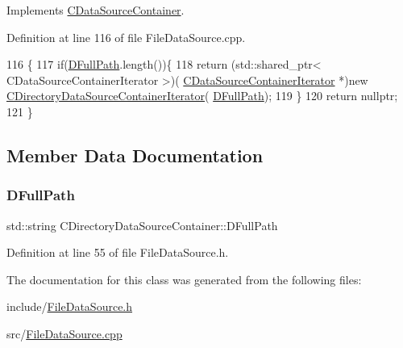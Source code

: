 Implements \hyperlink{classCDataSourceContainer_ad50184dd4ec1c79c776fe0d7d9910925}{C\+Data\+Source\+Container}.



Definition at line 116 of file File\+Data\+Source.\+cpp.


\begin{DoxyCode}
116                                                                                   \{
117     \textcolor{keywordflow}{if}(\hyperlink{classCDirectoryDataSourceContainer_ac3d3c7e7d7bc9f68ba8a8747a3dee8b5}{DFullPath}.length())\{
118         \textcolor{keywordflow}{return} (std::shared\_ptr< CDataSourceContainerIterator >)(
      \hyperlink{classCDataSourceContainerIterator}{CDataSourceContainerIterator} *)\textcolor{keyword}{new} 
      \hyperlink{classCDirectoryDataSourceContainerIterator}{CDirectoryDataSourceContainerIterator}(
      \hyperlink{classCDirectoryDataSourceContainer_ac3d3c7e7d7bc9f68ba8a8747a3dee8b5}{DFullPath});
119     \}
120     \textcolor{keywordflow}{return} \textcolor{keyword}{nullptr};
121 \}
\end{DoxyCode}


\subsection{Member Data Documentation}
\hypertarget{classCDirectoryDataSourceContainer_ac3d3c7e7d7bc9f68ba8a8747a3dee8b5}{}\label{classCDirectoryDataSourceContainer_ac3d3c7e7d7bc9f68ba8a8747a3dee8b5} 
\subsubsection{\texorpdfstring{D\+Full\+Path}{DFullPath}}
{\footnotesize\ttfamily std\+::string C\+Directory\+Data\+Source\+Container\+::\+D\+Full\+Path\hspace{0.3cm}{\ttfamily [protected]}}



Definition at line 55 of file File\+Data\+Source.\+h.



The documentation for this class was generated from the following files\+:\begin{DoxyCompactItemize}
\item 
include/\hyperlink{FileDataSource_8h}{File\+Data\+Source.\+h}\item 
src/\hyperlink{FileDataSource_8cpp}{File\+Data\+Source.\+cpp}\end{DoxyCompactItemize}
